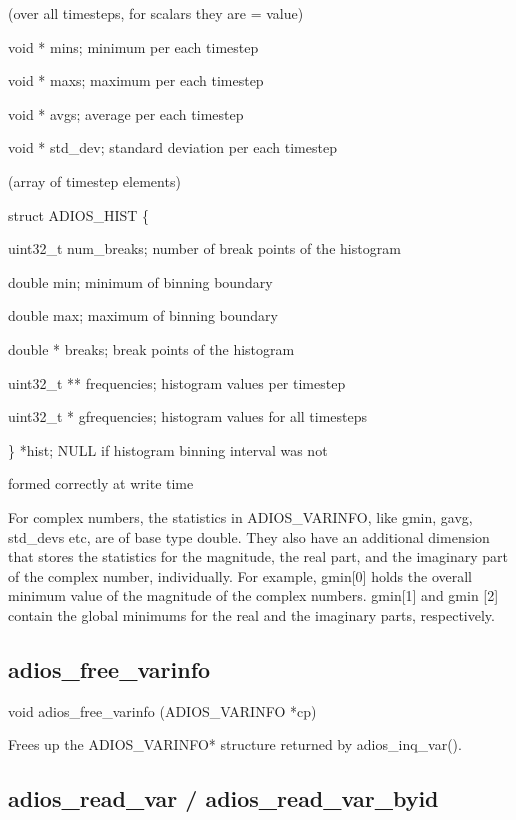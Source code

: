 \parindent=36pt
(over all timesteps, for scalars they are = value)

\parindent=0pt
void      * mins; minimum per each timestep 

void      * maxs;  maximum per each timestep

void      * avgs;  average per each timestep

void      * std\_dev;  standard deviation per each timestep

\parindent=36pt
(array of timestep elements)

\parindent=0pt
struct ADIOS\_HIST \{

\parindent=3pt
uint32\_t      num\_breaks;  number of break points of the histogram

\parindent=7pt
double   min; minimum of binning boundary 

double   max;  maximum of binning boundary 

\parindent=14pt
double    *   breaks;        break points of the histogram

\parindent=7pt
uint32\_t  ** frequencies; histogram values per timestep

uint32\_t  *   gfrequencies;  histogram values for all timesteps

\leftskip=166pt
\parindent=-144pt
\} *hist;   NULL if histogram binning interval was not 

formed correctly at write time

\leftskip=0pt
\parindent=0pt
For complex numbers, the statistics in ADIOS\_VARINFO, like gmin, gavg, std\_devs 
etc, are of base type double. They also have an additional dimension that stores 
the statistics for the magnitude, the real part, and the imaginary part of the 
complex number, individually. For example, gmin[0] holds the overall minimum value 
of the magnitude of the complex numbers. gmin[1] and gmin [2] contain the global 
minimums for the real and the imaginary parts, respectively. \label{HToc182553406}

\subsection{adios\_free\_varinfo}

void adios\_free\_varinfo (ADIOS\_VARINFO *cp)

Frees up the ADIOS\_VARINFO* structure returned by adios\_inq\_var().\label{HToc182553407}

\subsection{adios\_read\_var / adios\_read\_var\_byid}

